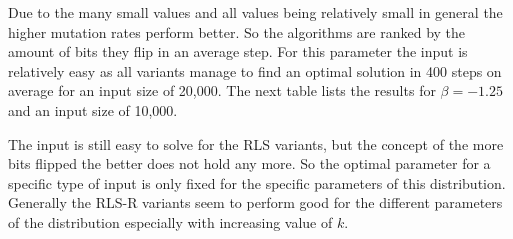 Due to the many small values and all values being relatively small in general the higher mutation rates perform better.
So the algorithms are ranked by the amount of bits they flip in an average step.
For this parameter the input is relatively easy as all variants manage to find an optimal solution in 400 steps on average for an input size of 20,000.
The next table lists the results for $\beta=-1.25$ and an input size of 10,000.



The input is still easy to solve for the RLS variants, but the concept of the more bits flipped the better does not hold any more.
So the optimal parameter for a specific type of input is only fixed for the specific parameters of this distribution.
Generally the RLS-R variants seem to perform good for the different parameters of the distribution especially with increasing value of $k$.